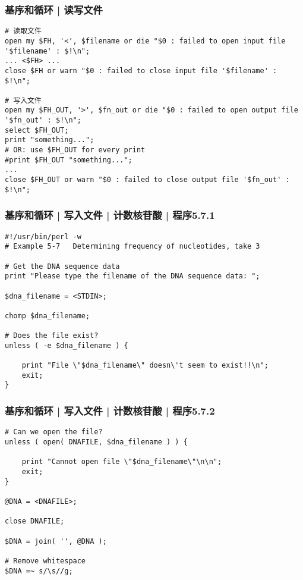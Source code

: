 \begin{frame}[fragile]
  \frametitle{基序和循环 | \alert{读写文件}}
\begin{lstlisting}[basicstyle=\small\tt]
# 读取文件
open my $FH, '<', $filename or die "$0 : failed to open input file '$filename' : $!\n";
... <$FH> ...
close $FH or warn "$0 : failed to close input file '$filename' : $!\n";

# 写入文件
open my $FH_OUT, '>', $fn_out or die "$0 : failed to open output file '$fn_out' : $!\n";
select $FH_OUT;
print "something...";
# OR: use $FH_OUT for every print
#print $FH_OUT "something...";
... 
close $FH_OUT or warn "$0 : failed to close output file '$fn_out' : $!\n";
\end{lstlisting}
\end{frame}

\begin{frame}[fragile]
  \frametitle{基序和循环 | 写入文件 | 计数核苷酸 | 程序5.7.1}
  \vspace{-0.5em}
\begin{lstlisting}[firstnumber=1,basicstyle=\footnotesize\tt,numberstyle=\scriptsize]
#!/usr/bin/perl -w
# Example 5-7   Determining frequency of nucleotides, take 3

# Get the DNA sequence data
print "Please type the filename of the DNA sequence data: ";

$dna_filename = <STDIN>;

chomp $dna_filename;

# Does the file exist?
unless ( -e $dna_filename ) {

    print "File \"$dna_filename\" doesn\'t seem to exist!!\n";
    exit;
}
\end{lstlisting}
\end{frame}

\begin{frame}[fragile]
  \frametitle{基序和循环 | 写入文件 | 计数核苷酸 | 程序5.7.2}
\begin{lstlisting}[firstnumber=18,basicstyle=\small\tt]
# Can we open the file?
unless ( open( DNAFILE, $dna_filename ) ) {

    print "Cannot open file \"$dna_filename\"\n\n";
    exit;
}

@DNA = <DNAFILE>;

close DNAFILE;

$DNA = join( '', @DNA );

# Remove whitespace
$DNA =~ s/\s//g;
\end{lstlisting}
\end{frame}

